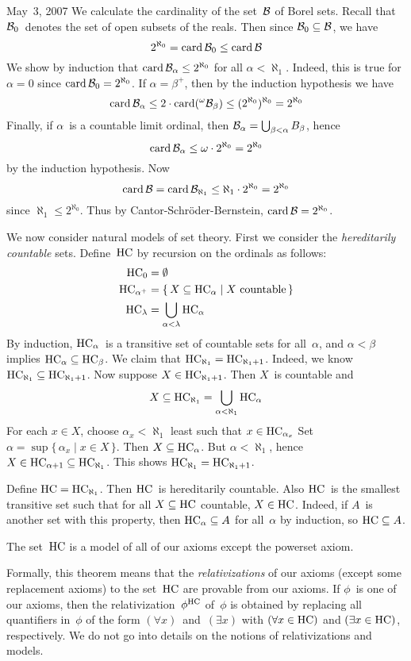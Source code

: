 \begin{lecture}{May~3, 2007}
We calculate the cardinality of the set~\(\mathcal{B}\) of Borel sets. Recall that \(\mathcal{B}_0\)~denotes the set of open subsets of the reals. Then since \(\mathcal{B}_0\subseteq\mathcal{B}\), we have
\[2^{\aleph_0}=\operatorname{card}\mathcal{B}_0\le\operatorname{card}\mathcal{B}\]
We show by induction that \(\operatorname{card}\mathcal{B}_{\alpha}\le 2^{\aleph_0}\) for all \(\alpha<\aleph_1\). Indeed, this is true for \(\alpha=0\) since \(\operatorname{card}\mathcal{B}_0=2^{\aleph_0}\). If \(\alpha=\beta^+\), then by the induction hypothesis we have
\[\operatorname{card}\mathcal{B}_{\alpha}\le 2\cdot\operatorname{card}({}^{\omega}{\mathcal{B}_{\beta}})\le(2^{\aleph_0})^{\aleph_0}=2^{\aleph_0}\]
Finally, if \(\alpha\)~is a countable limit ordinal, then \(\mathcal{B}_{\alpha}=\bigcup_{\beta<\alpha}B_{\beta}\), hence
\[\operatorname{card}\mathcal{B}_{\alpha}\le\omega\cdot 2^{\aleph_0}=2^{\aleph_0}\]
by the induction hypothesis. Now
\[\operatorname{card}\mathcal{B}=\operatorname{card}\mathcal{B}_{\aleph_1}\le\aleph_1\cdot 2^{\aleph_0}=2^{\aleph_0}\]
since \(\aleph_1\le 2^{\aleph_0}\). Thus by Cantor-Schr\"oder-Bernstein, \(\operatorname{card}\mathcal{B}=2^{\aleph_0}\).

We now consider natural models of set theory. First we consider the \emph{hereditarily countable} sets. Define~\(\mathrm{HC}\) by recursion on the ordinals as follows:
\begin{align*}
\mathrm{HC}_0&=\emptyset\\
\mathrm{HC}_{\alpha^+}&=\{\,X\subseteq \mathrm{HC}_{\alpha}\mid X\text{ countable}\,\}\\
\mathrm{HC}_{\lambda}&=\bigcup_{\alpha<\lambda}\mathrm{HC}_{\alpha}
\end{align*}
By induction, \(\mathrm{HC}_{\alpha}\)~is a transitive set of countable sets for all~\(\alpha\), and \(\alpha<\beta\) implies \(\mathrm{HC}_{\alpha}\subseteq\mathrm{HC}_{\beta}\). We claim that \(\mathrm{HC}_{\aleph_1}=\mathrm{HC}_{\aleph_1+1}\). Indeed, we know \(\mathrm{HC}_{\aleph_1}\subseteq\mathrm{HC}_{\aleph_1+1}\). Now suppose \(X\in\mathrm{HC}_{\aleph_1+1}\). Then \(X\)~is countable and
\[X\subseteq\mathrm{HC}_{\aleph_1}=\bigcup_{\alpha<\aleph_1}\mathrm{HC}_{\alpha}\]
For each \(x\in X\), choose \(\alpha_x<\aleph_1\) least such that \(x\in\mathrm{HC}_{\alpha_x}\) Set \(\alpha=\sup\{\,\alpha_x\mid x\in X\,\}\). Then \(X\subseteq\mathrm{HC}_{\alpha}\). But \(\alpha<\aleph_1\), hence \(X\in\mathrm{HC}_{\alpha+1}\subseteq\mathrm{HC}_{\aleph_1}\). This shows \(\mathrm{HC}_{\aleph_1}=\mathrm{HC}_{\aleph_1+1}\).

Define \(\mathrm{HC}=\mathrm{HC}_{\aleph_1}\). Then \(\mathrm{HC}\)~is hereditarily countable. Also \(\mathrm{HC}\)~is the smallest transitive set such that for all \(X\subseteq\mathrm{HC}\) countable, \(X\in\mathrm{HC}\). Indeed, if \(A\)~is another set with this property, then \(\mathrm{HC}_{\alpha}\subseteq A\) for all~\(\alpha\) by induction, so \(\mathrm{HC}\subseteq A\).
\begin{thm}
The set~\(\mathrm{HC}\) is a model of all of our axioms except the powerset axiom.
\end{thm}
\begin{rmk}
Formally, this theorem means that the \emph{relativizations} of our axioms (except some replacement axioms) to the set~\(\mathrm{HC}\) are provable from our axioms. If \(\phi\)~is one of our axioms, then the relativization~\(\phi^{\mathrm{HC}}\) of~\(\phi\) is obtained by replacing all quantifiers in~\(\phi\) of the form \((\forall x)\)~and~\((\exists x)\) with \((\forall x\in\mathrm{HC})\) and \((\exists x\in\mathrm{HC})\), respectively. We do not go into details on the notions of relativizations and models.
\end{rmk}


\end{lecture}
